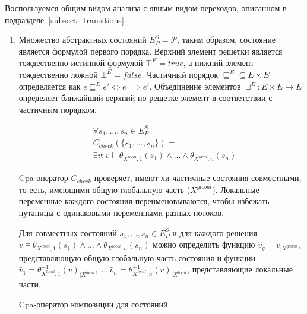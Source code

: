 Воспользуемся общим видом анализа с явным видом переходов, описанном в подразделе~\ref{subsect_transitions}.
 
\begin{enumerate}

\item 
Множество абстрактных состояний $E^S_P = \mathscr{P}$, таким образом, состояние является формулой первого порядка.
Верхний элемент решетки является тождественно истинной формулой
$\top^E = true$, а нижний элемент -- тождественно ложной $\bot^E = false$.
Частичный порядок $\sqsubseteq^E \subseteq E \times E$ определяется как $e \sqsubseteq^E e' \Leftrightarrow e \implies e'$.
Объединение элементов $\sqcup^E: E \times E \to E$ определяет ближайший верхний по решетке элемент в соответствии с частичным порядком.

\begin{equation}
\begin{aligned}
& \forall s_1, \dots, s_n \in E^S_P \\
& C_{check}(\{s_1,\dots, s_n\}) = \\
& \exists v: v \models \theta_{X^{local},1}(s_1) \land \dots \land \theta_{X^{local},n}(s_n)
\end{aligned}
\end{equation}

Cpa-оператор $C_{check}$ проверяет, имеют ли частичные состояния совместными, то есть, имеющими общую глобальную часть ($X^{global}$).
Локальные переменные каждого состояния переименовываются, чтобы избежать путаницы с одинаковыми переменными разных потоков.

Для совместных состояний $s_1, \dots, s_n \in E^S_P$ и для каждого решения 
$v \models \theta_{X^{local},1}(s_1) \land \dots \land \theta_{X^{local},n}(s_n)$
можно определить функцию $\hat v_g = v_{\mid X^{global}}$, представляющую общую глобальную часть состояния и функции $\hat v_1=\theta_{X^{local},1}^{-1}(v)_{\mid X^{local}}, \dots, \hat v_n=\theta_{X^{local},n}^{-1}(v)_{\mid X^{local}}$, представляющие локальные части.

Cpa-оператор композиции для состояний


\end{enumerate}
